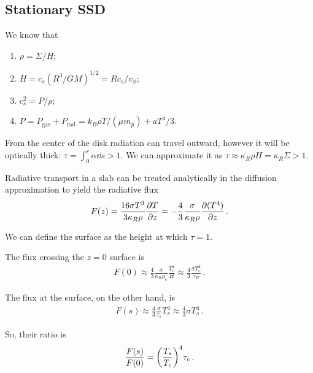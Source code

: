 \documentclass[main.tex]{subfiles}
\begin{document}
\subsection{Stationary SSD}


We know that \begin{enumerate}
    \item \(\rho = \Sigma / H\);
    \item \(H = c_s (R^3 / GM)^{1/2} = R c_s / v_\phi \);
    \item \(c_s^2 = P / \rho \);
    \item \(P = P _{\text{gas}} + P _{\text{rad}} = k_B \rho T / (\mu m_p) + a T^{4} / 3\).
\end{enumerate}

From the center of the disk radiation can travel outward, however it will be optically thick: \(\tau = \int_{0}^{r} \alpha \dd{s} >1\).
We can approximate it as \(\tau \approx \kappa _R \rho H = \kappa _R \Sigma > 1\).

Radiative transport in a slab can be treated analytically in the diffusion approximation to yield the radiative flux 
%
\begin{align}
F(z) = \frac{16 \sigma T^3}{3 \kappa _R \rho } \pdv{T}{z} = - \frac{4}{3} \frac{\sigma}{\kappa _R \rho } \pdv{(T^{4})}{z}
\,.
\end{align}

We can define the surface as the height at which \(\tau =1\).

The flux crossing the \(z = 0\) surface is 
%
\begin{align}
F(0) \approx \frac{4}{3} \frac{\sigma }{\kappa _R \rho _c} \frac{T_c^{4}}{H} \approx \frac{4}{3} \frac{\sigma T_c^{4}}{\tau _R}
\,.
\end{align}


The flux at the surface, on the other hand, is
%
\begin{align}
F(s) \approx \frac{4}{3} \frac{\sigma}{\tau _s} T_s^{4} \approx \frac{4}{3} \sigma T_s^{4}
\,.
\end{align}

So, their ratio is 
%
\begin{align}
\frac{F(s)}{F(0)} = \qty(\frac{T_s}{T_c})^{4} \tau _c 
\,.
\end{align}
\end{document}
